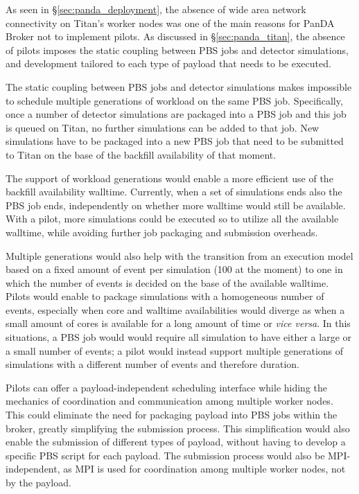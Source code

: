 As seen in \S\ref{sec:panda_deployment}, the absence of wide area network
connectivity on Titan's worker nodes was one of the main reasons for PanDA
Broker not to implement pilots. As discussed in \S\ref{sec:panda_titan}, the
absence of pilots imposes the static coupling between PBS jobs and detector
simulations, and development tailored to each type of payload that needs to be
executed.

The static coupling between PBS jobs and detector simulations makes impossible
to schedule multiple generations of workload on the same PBS job. Specifically,
once a number of detector simulations are packaged into a PBS job and this job
is queued on Titan, no further simulations can be added to that job. New
simulations have to be packaged into a new PBS job that need to be submitted to
Titan on the base of the backfill availability of that moment.

The support of workload generations would enable a more efficient use of the
backfill availability walltime. Currently, when a set of simulations ends also
the PBS job ends, independently on whether more walltime would still be
available. With a pilot, more simulations could be executed so to utilize all
the available walltime, while avoiding further job packaging and submission
overheads.

Multiple generations would also help with the transition from an execution model
based on a fixed amount of event per simulation (100 at the moment) to one in
which the number of events is decided on the base of the available walltime.
Pilots would enable to package simulations with a homogeneous number of events,
especially when core and walltime availabilities would diverge as when a small
amount of cores is available for a long amount of time or \textit{vice versa}.
In this situations, a PBS job would would require all simulation to have either
a large or a small number of events; a pilot would instead support multiple
generations of simulations with a different number of events and therefore
duration.

Pilots can offer a payload-independent scheduling interface while hiding the
mechanics of coordination and communication among multiple worker nodes. This
could eliminate the need for packaging payload into PBS jobs within the broker,
greatly simplifying the submission process. This simplification would also
enable the submission of different types of payload, without having to develop a
specific PBS script for each payload. The submission process would also be
MPI-independent, as MPI is used for coordination among multiple worker nodes,
not by the payload.

